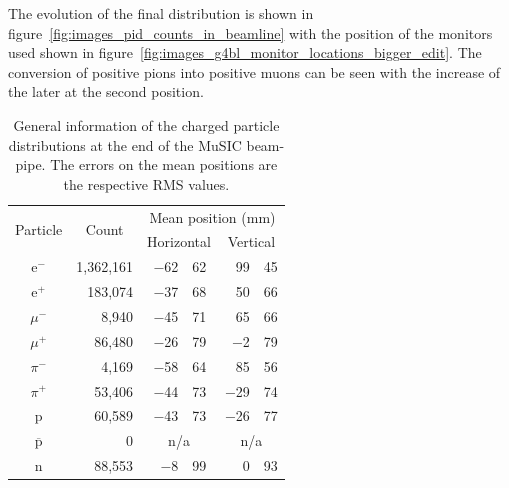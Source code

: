 The evolution of the final distribution is shown in figure~\ref{fig:images_pid_counts_in_beamline} with the position of the monitors used shown in figure~\ref{fig:images_g4bl_monitor_locations_bigger_edit}. The conversion of positive pions into positive muons can be seen with the increase of the later at the second position.

\begin{table}[hptb]
  \begin{center}
  \begin{tabular}{c | r | r@{\(\pm\)}l | r@{\(\pm\)}l }
    \multicolumn{1}{c|}{\multirow{2}{*}{Particle}} 
               &   \multicolumn{1}{c|}{\multirow{2}{*}{Count}} 
                              &  \multicolumn{4}{c}{Mean position (mm)}    \\
               &              &  \multicolumn{2}{c|}{Horizontal}  
                                              &  \multicolumn{2}{c}{Vertical} \\
    \hline
      e\(^-\)  &  1,362,161  &  \(-\)62 & 62  &       99 & 45  \\
      e\(^+\)  &    183,074  &  \(-\)37 & 68  &       50 & 66  \\
    \(\mu^-\)  &      8,940  &  \(-\)45 & 71  &       65 & 66  \\
    \(\mu^+\)  &     86,480  &  \(-\)26 & 79  &   \(-\)2 & 79  \\
    \(\pi^-\)  &      4,169  &  \(-\)58 & 64  &       85 & 56  \\
    \(\pi^+\)  &     53,406  &  \(-\)44 & 73  &  \(-\)29 & 74  \\
       p       &     60,589  &  \(-\)43 & 73  &  \(-\)26 & 77  \\
    \(\overline{\text{p}}\)
               &          0  & \multicolumn{2}{c|}{n/a}  
                                              &  \multicolumn{2}{c}{n/a}  \\
       n       &     88,553  &   \(-\)8 & 99  &        0 & 93  \\
  \end{tabular}
  \end{center}
  \caption{General information of the charged particle distributions at the end of the MuSIC beam-pipe. The errors on the mean positions are the respective RMS values.}
  \label{tab:g4bl_particle_counts}
\end{table}

